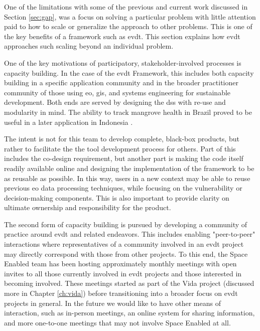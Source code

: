 One of the limitations with some of the previous and current work discussed in Section \ref{sec:gap}, was a focus on solving a particular problem with little attention paid to how to scale or generalize the approach to other problems. This is one of the key benefits of a framework such as \ac{evdt}. This section explains how \ac{evdt} approaches such scaling beyond an individual problem.

One of the key motivations of participatory, stakeholder-involved processes is capacity building. In the case of the \ac{evdt} Framework, this includes both capacity building in a specific application community and in the broader practitioner community of those using \ac{eo}, \ac{gis}, and systems engineering for sustainable development. Both ends are served by designing the \ac{dss} with re-use and modularity in mind. The ability to track mangrove health in Brazil \cite{reidInteractiveModelAssessing2020} proved to be useful in a later application in Indonesia \cite{lombardoEnvironmentVulnerabilityDecisionTechnologyFrameworkDecision2022}. 

The intent is not for this team to develop complete, black-box products, but rather to facilitate the the tool development process for others. Part of this includes the co-design requirement, but another part is making the code itself readily available online and designing the implementation of the framework to be as reusable as possible. In this way, users in a new context may be able to reuse previous \ac{eo} data processing techniques, while focusing on the vulnerability or decision-making components. This is also important to provide clarity on ultimate ownership and responsibility for the product.

The second form of capacity building is pursued by developing a community of practice around \ac{evdt} and related endeavors. This includes enabling "peer-to-peer" interactions where representatives of a community involved in an \ac{evdt} project may directly correspond with those from other projects. To this end, the Space Enabled team has been hosting approximately monthly meetings with open invites to all those currently involved in \ac{evdt} projects and those interested in becoming involved. These meetings started as part of the Vida project (discussed more in Chapter \ref{ch:vida}) before transitioning into a broader focus on \ac{evdt} projects in general. In the future we would like to have other means of interaction, such as in-person meetings, an online system for sharing information, and more one-to-one meetings that may not involve Space Enabled at all.

